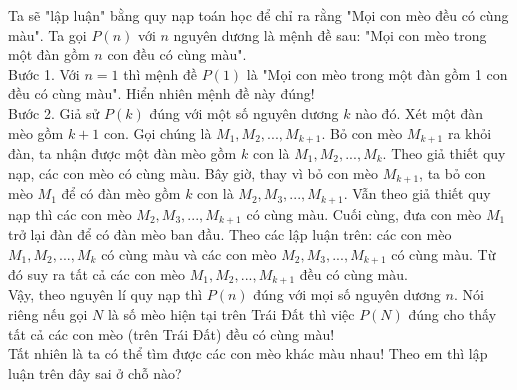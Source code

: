 \begin{bt}%
	Ta sẽ "lập luận" bằng quy nạp toán học để chỉ ra rằng "Mọi con mèo đều có cùng màu". Ta gọi $P(n)$ với $n$ nguyên dương là mệnh đề sau: "Mọi con mèo trong một đàn gồm $n$ con đều có cùng màu". \\
	Bước 1. Với $n=1$ thì mệnh đề $P(1)$ là "Mọi con mèo trong một đàn gồm 1 con đều có cùng màu". Hiển nhiên mệnh đề này đúng!\\
	Bước 2. Giả sử $P(k)$ đúng với một số nguyên dương $k$ nào đó. Xét một đàn mèo gồm $k+1$ con. Gọi chúng là $M_{1}, M_{2}, ..., M_{k+1}$. Bỏ con mèo $M_{k+1}$ ra khỏi đàn, ta nhận được một đàn mèo gồm $k$ con là $M_{1}, M_{2}, ..., M_{k}$. Theo giả thiết quy nạp, các con mèo có cùng màu. Bây giờ, thay vì bỏ con mèo $M_{k+1}$, ta bỏ con mèo $M_{1}$ để có đàn mèo gồm $k$ con là $M_{2}, M_{3}, ..., M_{k+1}$. Vẫn theo giả thiết quy nạp thì các con mèo $M_{2}, M_{3}, ..., M_{k+1}$ có cùng màu. Cuối cùng, đưa con mèo $M_{1}$ trở lại đàn để có đàn mèo ban đầu. Theo các lập luận trên: các con mèo $M_{1}, M_{2}, ..., M_{k}$ có cùng màu và các con mèo $M_{2}, M_{3}, ..., M_{k+1}$ có cùng màu. Từ đó suy ra tất cả các con mèo $M_{1}, M_{2}, ..., M_{k+1}$ đều có cùng màu.\\
	Vậy, theo nguyên lí quy nạp thì $P(n)$ đúng với mọi số nguyên dương $n$. Nói riêng nếu gọi $N$ là số mèo hiện tại trên Trái Đất thì việc $P(N)$ đúng cho thấy tất cả các con mèo (trên Trái Đất) đều có cùng màu!\\
	Tất nhiên là ta có thể tìm được các con mèo khác màu nhau! Theo em thì lập luận trên đây sai ở chỗ nào?\\
\end{bt}
